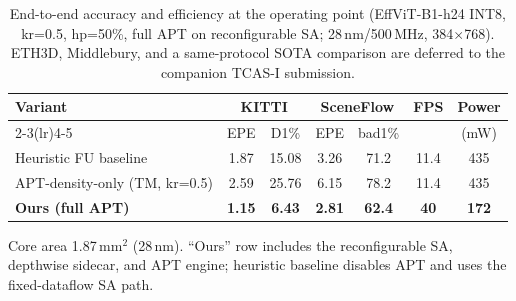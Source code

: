 \begin{table}[t]
\caption{End-to-end accuracy and efficiency at the operating point (EffViT-B1-h24 INT8, kr=0.5, hp=50\%, full APT on reconfigurable SA; 28\,nm/500\,MHz, 384$\times$768). ETH3D, Middlebury, and a same-protocol SOTA comparison are deferred to the companion TCAS-I submission.}
\label{tab:main}
\centering
\footnotesize
\setlength{\tabcolsep}{3pt}
\begin{tabular}{@{}lcccccc@{}}
\toprule
Variant & \multicolumn{2}{c}{KITTI} & \multicolumn{2}{c}{SceneFlow} & FPS & Power \\
\cmidrule(lr){2-3}\cmidrule(lr){4-5}
        & EPE & D1\% & EPE & bad1\% & & (mW) \\
\midrule
Heuristic FU baseline         & 1.87 & 15.08 & 3.26 & 71.2 & 11.4 & 435 \\
APT-density-only (TM, kr=0.5) & 2.59 & 25.76 & 6.15 & 78.2 & 11.4 & 435 \\
\textbf{Ours (full APT)}      & \textbf{1.15} & \textbf{6.43} & \textbf{2.81} & \textbf{62.4} & \textbf{40} & \textbf{172} \\
\bottomrule
\end{tabular}
\begin{flushleft}\scriptsize
Core area 1.87\,mm$^2$ (28\,nm). ``Ours'' row includes the reconfigurable SA, depthwise sidecar, and APT engine; heuristic baseline disables APT and uses the fixed-dataflow SA path.
\end{flushleft}
\end{table}
